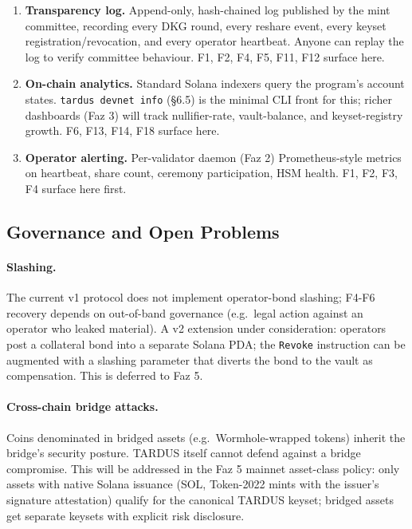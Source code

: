\begin{enumerate}[leftmargin=2em,itemsep=0pt]
  \item \textbf{Transparency log.} Append-only, hash-chained log
    published by the mint committee, recording every DKG round,
    every reshare event, every keyset registration/revocation, and
    every operator heartbeat. Anyone can replay the log to verify
    committee behaviour. F1, F2, F4, F5, F11, F12 surface here.
  \item \textbf{On-chain analytics.} Standard Solana indexers query
    the program's account states. \texttt{tardus devnet info}
    (\S6.5) is the minimal CLI front for this; richer dashboards
    (Faz 3) will track nullifier-rate, vault-balance, and
    keyset-registry growth. F6, F13, F14, F18 surface here.
  \item \textbf{Operator alerting.} Per-validator daemon (Faz 2)
    Prometheus-style metrics on heartbeat, share count, ceremony
    participation, HSM health. F1, F2, F3, F4 surface here first.
\end{enumerate}

\subsection{Governance and Open Problems}
\label{sec:failure-open}

\paragraph{Slashing.} The current v1 protocol does not implement
operator-bond slashing; F4-F6 recovery depends on out-of-band
governance (e.g.\ legal action against an operator who leaked
material). A v2 extension under consideration: operators post a
collateral bond into a separate Solana PDA; the
\texttt{Revoke} instruction can be augmented with a slashing
parameter that diverts the bond to the vault as compensation. This is
deferred to Faz 5.

\paragraph{Cross-chain bridge attacks.} Coins denominated in
bridged assets (e.g.\ Wormhole-wrapped tokens) inherit the bridge's
security posture. TARDUS itself cannot defend against a bridge
compromise. This will be addressed in the Faz 5 mainnet asset-class
policy: only assets with native Solana issuance (SOL, Token-2022 mints
with the issuer's signature attestation) qualify for the canonical
TARDUS keyset; bridged assets get separate keysets with explicit
risk disclosure.

